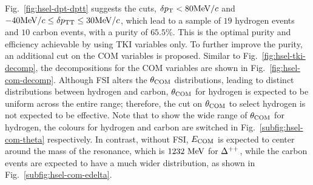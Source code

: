      Fig.~\ref{fig:hsel-dpt-dptt} suggests the cuts, $\delta p_\textrm{T} < 80\textrm{MeV}/c$ and $-40\textrm{MeV}/c \leq \delta p_\textrm{TT} \leq 30\textrm{MeV}/c$, which lead to a sample of $19$ hydrogen events and $10$ carbon events, with a purity of $65.5\%$.
     This is the optimal purity and efficiency achievable by using TKI variables only.
     To further improve the purity, an additional cut on the COM variables is proposed.
     Similar to Fig.~\ref{fig:hsel-tki-decomp}, the decompositions for the COM variables are shown in Fig.~\ref{fig:hsel-com-decomp}.
     Although FSI alters the $\theta_{\textrm{COM}}$ distributions, leading to distinct distributions between hydrogen and carbon, $\theta_{\textrm{COM}}$ for hydrogen is expected to be uniform across the entire range; therefore, the cut on $\theta_{\textrm{COM}}$ to select hydrogen is not expected to be effective.
     Note that to show the wide range of $\theta_{\textrm{COM}}$ for hydrogen, the colours for hydrogen and carbon are switched in Fig.~\ref{subfig:hsel-com-theta} respectively.
     In contrast, without FSI, $E_{\textrm{COM}}$ is expected to center around the mass of the resonance, which is $1232~\textrm{MeV}$ for $\Delta^{++}$, while the carbon events are expected to have a much wider distribution, as shown in Fig.~\ref{subfig:hsel-com-edelta}.
